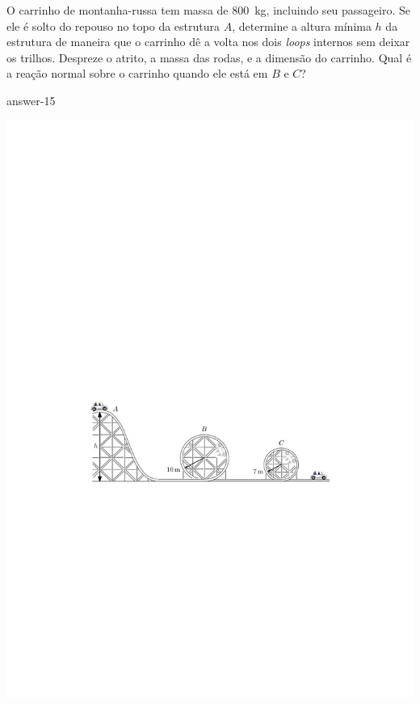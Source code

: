 
\item O carrinho de montanha-russa tem massa de \SI{800}{\kilogram}, incluindo seu passageiro. Se ele é solto do repouso no topo da estrutura $A$, determine a altura mínima $h$ da estrutura de maneira que o carrinho dê a volta nos dois \textit{loops} internos sem deixar os trilhos. Despreze o atrito, a massa das rodas, e a dimensão do carrinho. Qual é a reação normal sobre o carrinho quando ele está em $B$ e $C$?

{answer-15}

\vspace{.5cm}
\begin{flushleft}
	\includegraphics[scale=1.3]{images/draw_15.pdf}
\end{flushleft}